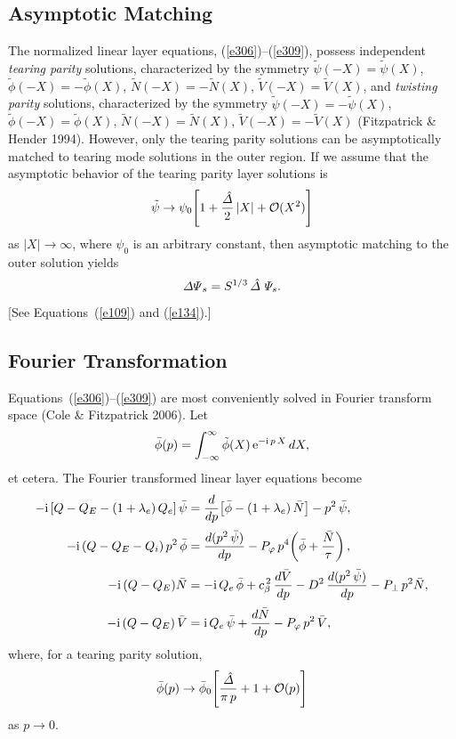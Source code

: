 \documentclass[notitlepage,12pt]{article}
\begin{document}
\subsection{Asymptotic Matching}
The normalized linear layer equations, (\ref{e306})--(\ref{e309}), possess independent {\em tearing parity}\/ solutions,
characterized by the symmetry $\tilde{\psi}(-X)=\tilde\psi(X)$, $\tilde{\phi}(-X)=-\tilde{\phi}(X)$, 
$\tilde{N}(-X)= - \tilde{N}(X)$, $\tilde{V}(-X)=\tilde{V}(X)$, and {\em twisting parity}\/ solutions, characterized by the symmetry 
$\tilde{\psi}(-X)=-\tilde\psi(X)$, $\tilde{\phi}(-X)=\tilde{\phi}(X)$, 
$\tilde{N}(-X)=  \tilde{N}(X)$, $\tilde{V}(-X)=-\tilde{V}(X)$ (Fitzpatrick \& Hender 1994). However, only the tearing parity
solutions can be asymptotically matched to tearing mode solutions in the outer region. If we assume that
the asymptotic behavior of the tearing parity layer solutions is
\begin{equation}\label{e311}
\tilde{\psi}\rightarrow  \psi_0\!\left[1+ \frac{\hat{\mit\Delta}}{2}\,|X| + {\cal O}(X^2)\right]
\end{equation}
as $|X|\rightarrow\infty$, where $\psi_0$ is an arbitrary constant, then asymptotic matching to the outer solution yields
\begin{equation}\label{e312}
{\mit\Delta\Psi}_s= S^{1/3}\,\hat{\mit\Delta}\,\,{\mit\Psi}_s.
\end{equation}
[See Equations~(\ref{e109}) and (\ref{e134}).] 

\subsection{Fourier Transformation}
Equations~(\ref{e306})--(\ref{e309}) are most conveniently solved in Fourier transform space (Cole \& Fitzpatrick 2006). 
Let
\begin{equation}
\bar{\phi}(p) = \int_{-\infty}^\infty \tilde{\phi}(X)\,{\rm e}^{-{\rm i}\,p\,X}\,dX,
\end{equation}
et cetera. The Fourier transformed linear layer equations become
\begin{align}\label{e314}
-{\rm i}\,[Q-Q_E-(1+\lambda_e)\,Q_{e}]\,\bar{\psi}&=\frac{d}{dp}\!\left[\bar{\phi}-(1+\lambda_e)\,\bar{N}\right] -p^2\,\bar{\psi},\\[0.5ex]
-{\rm i}\,(Q-Q_E -Q_{i})\,p^2\,\bar{\phi}&=  \frac{d(p^2\,\bar{\psi})}{dp}- P_\varphi\,p^4\!\left(\bar{\phi} + \frac{\bar{N}}{\tau}\right),\\[0.5ex]
-{\rm i}\,(Q-Q_E)\bar{N} &= - {\rm i}\,Q_{e}\,\bar{\phi} + c_\beta^{\,2}\,\frac{d\bar{V}}{dp}-D^{2}\,\frac{d(p^2\,\bar{\psi})}{dp}
  - P_\perp\,p^2\bar{N},\label{e316}\\[0.5ex]
 -{\rm i}\,(Q-Q_E)\,\bar{V} &= {\rm i}\,Q_{e}\,\bar{\psi} +\frac{d\bar{N}}{dp}- P_\varphi\,p^2\,\bar{V},\label{e317}
\end{align}
where, for a tearing parity solution, 
\begin{equation}
\bar{\phi}(p)\rightarrow \bar{\phi}_0\!\left[\frac{\hat{\mit\Delta}}{\pi\,p} + 1+ {\cal O}(p)\right]
\end{equation}
as $p\rightarrow 0$. 
\end{document}
